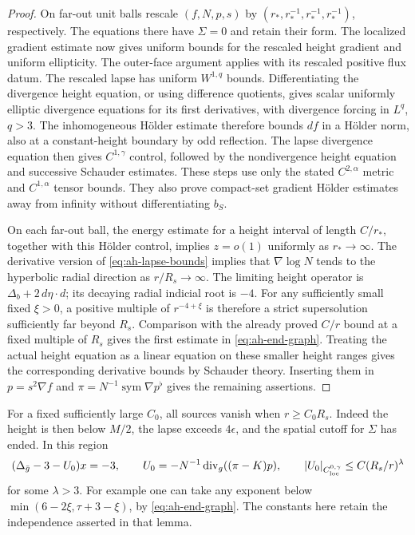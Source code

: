 \begin{proof}
On far-out unit balls rescale \((f,N,p,s)\) by
\((r_*,r_*^{-1},r_*^{-1},r_*^{-1})\), respectively.
The equations there have \(\Sigma=0\) and retain their form.
The localized gradient estimate now gives uniform bounds
for the rescaled height gradient and uniform ellipticity.
The outer-face argument applies with its rescaled positive
flux datum.  The rescaled lapse has uniform \(W^{1,q}\) bounds.
Differentiating the divergence height equation, or using
difference quotients, gives scalar uniformly elliptic
divergence equations for its first derivatives, with divergence
forcing in \(L^q\), \(q>3\).  The inhomogeneous Hölder estimate
therefore bounds \(df\) in a Hölder norm, also at a
constant-height boundary by odd reflection.  The lapse
divergence equation then gives \(C^{1,\gamma}\) control,
followed by the nondivergence height equation and successive
Schauder estimates.  These steps use only the stated
\(C^{2,\alpha}\) metric and \(C^{1,\alpha}\) tensor bounds.
They also prove compact-set gradient Hölder estimates away
from infinity without differentiating \(b_S\).

On each far-out ball, the energy estimate for a height interval
of length \(C/r_*\), together with this Hölder control, implies
\(z=o(1)\) uniformly as \(r_*\to\infty\).
The derivative version of \eqref{eq:ah-lapse-bounds} implies
that \(\nabla\log N\) tends to the hyperbolic radial direction
as \(r/R_s\to\infty\).  The limiting height operator is
\(\Delta_b+2\,d\eta\cdot d\); its decaying radial indicial
root is \(-4\).  For any sufficiently small fixed \(\xi>0\),
a positive multiple of \(r^{-4+\xi}\) is therefore a strict
supersolution sufficiently far beyond \(R_s\).
Comparison with the already proved \(C/r\) bound at a fixed
multiple of \(R_s\) gives the first estimate in
\eqref{eq:ah-end-graph}.  Treating the actual height equation
as a linear equation on these smaller height ranges gives
the corresponding derivative bounds by Schauder theory.
Inserting them in \(p=s^2\nabla f\) and
\(\pi=N^{-1}\operatorname{sym}\nabla p^\flat\) gives the
remaining assertions.
\end{proof}

For a fixed sufficiently large \(C_0\), all sources vanish when
\(r\ge C_0R_s\).  Indeed the height is then below \(M/2\),
the lapse exceeds \(4\epsilon\), and the spatial cutoff
for \(\Sigma\) has ended.  In this region
\begin{equation}\label{eq:ah-end-x}
 (\Delta_{\bar g}-3-U_0)x=-3,\qquad
 U_0=-N^{-1}\operatorname{div}_g((\pi-K)p),\qquad
 |U_0|_{C^{0,\gamma}_{\mathrm{loc}}}
       \le C(R_s/r)^\lambda
\end{equation}
for some \(\lambda>3\).  For example one can take any exponent
below \(\min(6-2\xi,\tau+3-\xi)\), by
\eqref{eq:ah-end-graph}.  The constants here retain the
independence asserted in that lemma.

